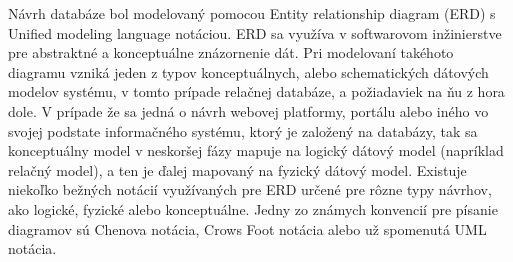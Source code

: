 Návrh databáze bol modelovaný pomocou Entity relationship diagram (ERD) s Unified modeling language notáciou. ERD sa využíva v softwarovom inžinierstve pre abstraktné a konceptuálne znázornenie dát. Pri modelovaní takéhoto diagramu vzniká jeden z typov konceptuálnych, alebo schematických dátových modelov systému, v tomto prípade relačnej databáze, a požiadaviek na ňu z hora dole. V prípade že sa jedná o návrh webovej platformy, portálu alebo iného vo svojej podstate informačného systému, ktorý je založený na databázy, tak sa konceptuálny model v neskoršej fázy mapuje na logický dátový model (napríklad relačný model), a ten je ďalej mapovaný na fyzický dátový model. Existuje niekoľko bežných notácií využívaných pre ERD určené pre rôzne typy návrhov, ako logické, fyzické alebo konceptuálne. Jedny zo známych konvencií pre písanie diagramov sú Chenova notácia, Crows Foot notácia alebo už spomenutá UML notácia.

